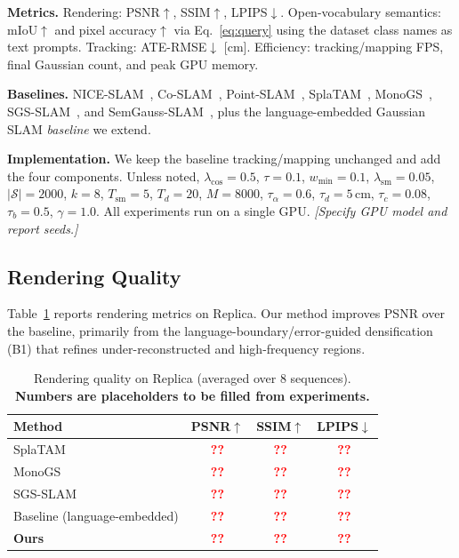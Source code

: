 \documentclass[10pt, journal]{IEEEtran}
\newcommand{\tofill}{\textcolor{red}{\textbf{??}}}
\newcommand{\best}[1]{\textbf{#1}}
\begin{document}
\textbf{Metrics.} Rendering: PSNR$\uparrow$, SSIM$\uparrow$,
LPIPS$\downarrow$. Open-vocabulary semantics: mIoU$\uparrow$ and pixel
accuracy$\uparrow$ via Eq.~\eqref{eq:query} using the dataset class names as text
prompts. Tracking: ATE-RMSE$\downarrow$ [cm]. Efficiency: tracking/mapping FPS,
final Gaussian count, and peak GPU memory.

\textbf{Baselines.} NICE-SLAM~\cite{zhu2022niceslam}, Co-SLAM~\cite{wang2023coslam},
Point-SLAM~\cite{sandstrom2023pointslam}, SplaTAM~\cite{keetha2024splatam},
MonoGS~\cite{matsuki2024monogs}, SGS-SLAM~\cite{li2024sgsslam}, and
SemGauss-SLAM~\cite{zhu2024semgauss}, plus the language-embedded Gaussian SLAM
\emph{baseline} we extend.

\textbf{Implementation.} We keep the baseline tracking/mapping unchanged and add
the four components. Unless noted, $\lambda_{\cos}\!=\!0.5$, $\tau\!=\!0.1$,
$w_{\min}\!=\!0.1$, $\lambda_{\text{sm}}\!=\!0.05$, $|\mathcal{S}|\!=\!2000$,
$k\!=\!8$, $T_{\text{sm}}\!=\!5$, $T_d\!=\!20$, $M\!=\!8000$, $\tau_\alpha\!=\!0.6$,
$\tau_d\!=\!5$\,cm, $\tau_c\!=\!0.08$, $\tau_b\!=\!0.5$, $\gamma\!=\!1.0$. All
experiments run on a single GPU. \emph{[Specify GPU model and report seeds.]}

\subsection{Rendering Quality}
Table~\ref{tab:render} reports rendering metrics on Replica. Our method improves
PSNR over the baseline, primarily from the language-boundary/error-guided
densification (B1) that refines under-reconstructed and high-frequency regions.

\begin{table}[t]
\centering
\caption{Rendering quality on Replica (averaged over 8 sequences). \textbf{Numbers are placeholders to be filled from experiments.}}
\label{tab:render}
\begin{tabular}{lccc}
\toprule
Method & PSNR$\uparrow$ & SSIM$\uparrow$ & LPIPS$\downarrow$ \\
\midrule
SplaTAM~\cite{keetha2024splatam} & \tofill & \tofill & \tofill \\
MonoGS~\cite{matsuki2024monogs}  & \tofill & \tofill & \tofill \\
SGS-SLAM~\cite{li2024sgsslam}    & \tofill & \tofill & \tofill \\
Baseline (language-embedded)     & \tofill & \tofill & \tofill \\
\textbf{Ours}                    & \best{\tofill} & \best{\tofill} & \best{\tofill} \\
\bottomrule
\end{tabular}
\end{table}
\end{document}
